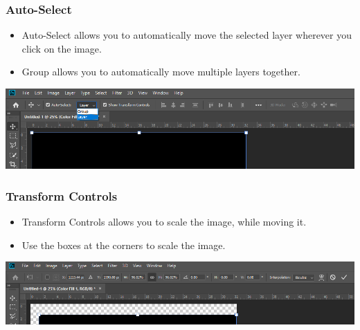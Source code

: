 \documentclass{beamer}
\begin{document}
\begin{frame}
	\frametitle{Auto-Select}
	\begin{itemize}
		\item Auto-Select allows you to automatically move the selected layer wherever you click on the image.
		\item Group allows you to automatically move multiple layers together.
	\end{itemize}
	\begin{center}
		\includegraphics[width = 1.0\textwidth]{images/move tool - auto select.png}
	\end{center}
\end{frame}

\begin{frame}
	\frametitle{Transform Controls}
	\begin{itemize}
		\item Transform Controls allows you to scale the image, while moving it.
		\item Use the boxes at the corners to scale the image.
	\end{itemize}
	\begin{center}
		\includegraphics[width = 1.0\textwidth]{images/move tool - transform controls.png}
	\end{center}
\end{frame}
\end{document}
